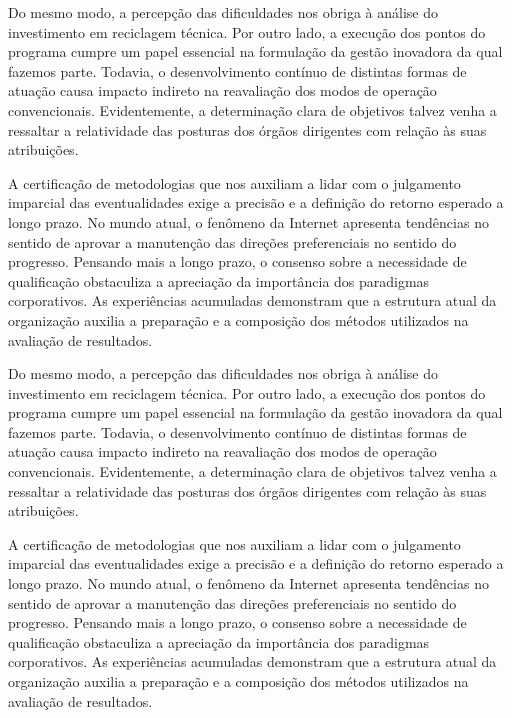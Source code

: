 \documentclass[a4paper,12pt]{udesc}
\begin{document}
          Do mesmo modo, a percepção das dificuldades nos obriga à análise do investimento em reciclagem técnica. Por outro lado, a execução dos pontos do programa cumpre um papel essencial na formulação da gestão inovadora da qual fazemos parte. Todavia, o desenvolvimento contínuo de distintas formas de atuação causa impacto indireto na reavaliação dos modos de operação convencionais. Evidentemente, a determinação clara de objetivos talvez venha a ressaltar a relatividade das posturas dos órgãos dirigentes com relação às suas atribuições.




          A certificação de metodologias que nos auxiliam a lidar com o julgamento imparcial das eventualidades exige a precisão e a definição do retorno esperado a longo prazo. No mundo atual, o fenômeno da Internet apresenta tendências no sentido de aprovar a manutenção das direções preferenciais no sentido do progresso. Pensando mais a longo prazo, o consenso sobre a necessidade de qualificação obstaculiza a apreciação da importância dos paradigmas corporativos. As experiências acumuladas demonstram que a estrutura atual da organização auxilia a preparação e a composição dos métodos utilizados na avaliação de resultados.



          Do mesmo modo, a percepção das dificuldades nos obriga à análise do investimento em reciclagem técnica. Por outro lado, a execução dos pontos do programa cumpre um papel essencial na formulação da gestão inovadora da qual fazemos parte. Todavia, o desenvolvimento contínuo de distintas formas de atuação causa impacto indireto na reavaliação dos modos de operação convencionais. Evidentemente, a determinação clara de objetivos talvez venha a ressaltar a relatividade das posturas dos órgãos dirigentes com relação às suas atribuições.




          A certificação de metodologias que nos auxiliam a lidar com o julgamento imparcial das eventualidades exige a precisão e a definição do retorno esperado a longo prazo. No mundo atual, o fenômeno da Internet apresenta tendências no sentido de aprovar a manutenção das direções preferenciais no sentido do progresso. Pensando mais a longo prazo, o consenso sobre a necessidade de qualificação obstaculiza a apreciação da importância dos paradigmas corporativos. As experiências acumuladas demonstram que a estrutura atual da organização auxilia a preparação e a composição dos métodos utilizados na avaliação de resultados.
\end{document}
